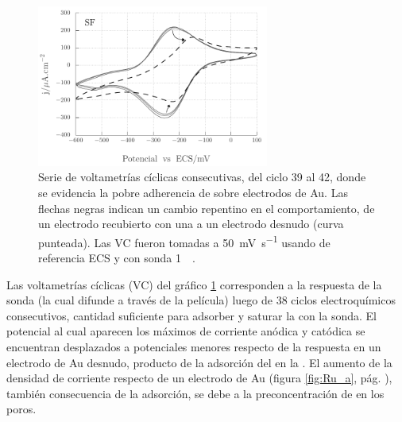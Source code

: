 				\begin{figure}[b!]
				 	   	    \begin{center} 
				        	\includegraphics[width=0.68\textwidth]{Graficos/Adherencia_F127.pdf}
				       		\caption[Adherencia de \pdmF \space sobre una película delgada de Au.]{Serie de voltametrías cíclicas consecutivas, del ciclo 39 al 42, donde se evidencia la pobre adherencia de \pdmF\space sobre electrodos de Au. Las flechas negras indican un cambio repentino en el comportamiento, de un electrodo recubierto con una \pdm\space a un electrodo desnudo (curva punteada). Las VC fueron tomadas a \SI{50}{\milli\volt.\second^{-1}} usando de referencia ECS y con sonda \ru\space \SI{1}{\milli\Molar}.}
				         	\label{fig:adherencia_F127}
				     		\end{center}
				     		\end{figure}

			 Las voltametrías cíclicas (VC) del gráfico \ref{fig:adherencia_F127} corresponden a la respuesta de la sonda \aminorutenio (la cual difunde a través de la película) luego de 38 ciclos electroquímicos consecutivos, cantidad suficiente para adsorber y saturar la \pdm\space con la sonda. El potencial al cual aparecen los máximos de corriente anódica y catódica se encuentran desplazados a potenciales menores respecto de la respuesta en un electrodo de Au desnudo, producto de la adsorción del \aminorutenio\space en la \pdm. El aumento de la densidad de corriente respecto de un electrodo de Au (figura \ref{fig:Ru_a}, pág. \pageref{fig:Ru_a}), también consecuencia de la adsorción, se debe a la preconcentración de \aminorutenio\space en los poros.\cite{Etienne2007,Gimenez2016-2} 

